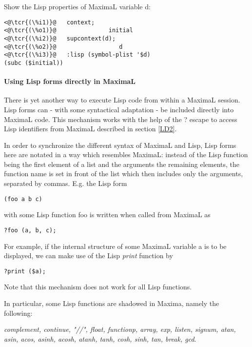 \documentclass[../Maxima_Workbook.tex]{subfiles}
\begin{document}
\lz Show the Lisp properties of MaximaL variable d:
\begin{lstlisting}
<@\tcr{(\%i1)}@   context;
<@\tcr{(\%o1)}@ 			  initial
<@\tcr{(\%i2)}@   supcontext(d);
<@\tcr{(\%o2)}@ 			     d
<@\tcr{(\%i3)}@   :lisp (symbol-plist '$d)
(subc ($initial))
\end{lstlisting}

\paragraph{Using Lisp forms directly in MaximaL} \mbox{}


\lz There is yet another way to execute Lisp code from within a MaximaL session. Lisp forms can - with some syntactical adaptation - be included directly into MaximaL code. This mechanism works with the help of the ? escape to access Lisp identifiers from MaximaL described in section \ref{LD2}. 

\lz In order to synchronize the different syntax of MaximaL and Lisp, Lisp forms here are notated in a way which resembles MaximaL: instead of the Lisp function being the first element of a list and the arguments the remaining elements, the function name is set in front of the list which then includes only the arguments, separated by commas. E.g. the Lisp form

\begin{lstlisting}
(foo a b c)
\end{lstlisting}

with some Lisp function foo is written when called from MaximaL as

\begin{lstlisting}
?foo (a, b, c);
\end{lstlisting}

For example, if the internal structure of some MaximaL variable a is to be displayed, we can make use of the Lisp \emph{print} function by 

\begin{lstlisting}
?print ($a);
\end{lstlisting}

Note that this mechanism does not work for all Lisp functions.

\lz In particular, some Lisp functions are shadowed in Maxima, namely the following:

\emph{complement, continue, "//", float, functionp, array, exp, listen, signum, atan, asin, acos, asinh, acosh, atanh, tanh, cosh, sinh, tan, break, gcd}.
\end{document}
